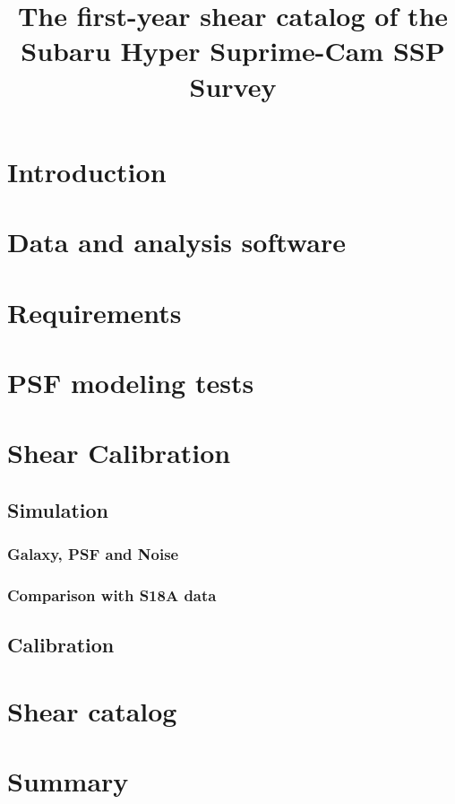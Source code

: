 \documentclass[useamsfonts]{pasj01}
\begin{document}
\title{The first-year shear catalog of the Subaru Hyper Suprime-Cam SSP Survey}

\section{Introduction}\label{sec:Intro}

\section{Data and analysis software}\label{sec:software}

\section{Requirements}\label{sec:requirements}

\section{PSF modeling tests}\label{sec:psf}

\section{Shear Calibration} \label{sec:sim}

\subsection{Simulation}
\subsubsection{Galaxy, PSF and Noise}

\subsubsection{Comparison with S18A data}
\subsection{Calibration}

\section{Shear catalog}\label{sec:shear}

\section{Summary}
\end{document}

